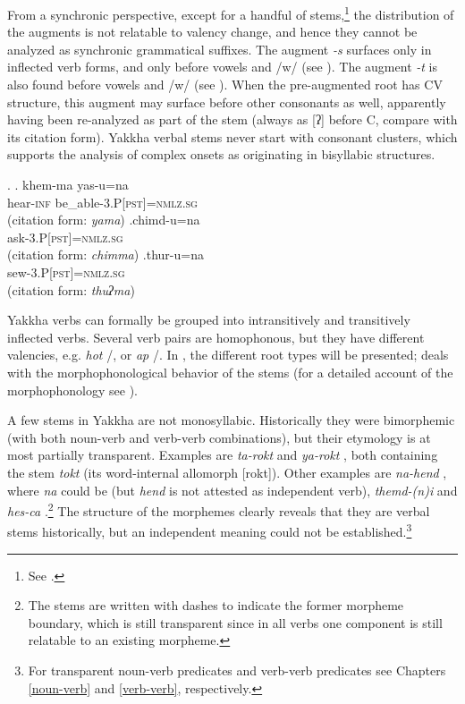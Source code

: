 From a synchronic perspective, except for a handful of stems,\footnote{See .} the distribution of the augments is not relatable to valency change, and hence they cannot be analyzed as synchronic grammatical suffixes. The augment \emph{-s} surfaces only in inflected verb forms, and only before vowels and /w/ (see \Next[a]). The augment \emph{-t} is also found before vowels and /w/ (see \Next[b]). When the pre-augmented root has CV structure, this augment may surface before other consonants as well, apparently having been re-analyzed as part of the  stem (always as [ʔ] before C, compare \Next[c] with its citation form). Yakkha verbal stems never start with consonant clusters, which supports the analysis of complex onsets as originating in bisyllabic structures. 

\ex. \ag. khem-ma yas-u=na\\
 hear{\scshape -inf} be\_able{\scshape -3.P[pst]=nmlz.sg}\\
 (citation form: \emph{yama})
\bg.chimd-u=na\\
ask{\scshape -3.P[pst]=nmlz.sg}\\
 (citation form: \emph{chimma})
\bg.thur-u=na\\
sew{\scshape -3.P[pst]=nmlz.sg}\\
 (citation form: \emph{thuʔma})


Yakkha verbs can  formally  be grouped into intransitively and transitively inflected verbs. Several verb pairs are homophonous, but they have different valencies, e.g. \emph{hot} /, or \emph{ap}   /. In , the different root types will be presented;  deals with the morphophonological behavior of the stems (for a detailed account of the morphophonology see ).

A few stems in Yakkha are not monosyllabic. Historically they were bimorphemic (with both noun-verb and verb-verb combinations), but their etymology is at most partially transparent. Examples are \emph{ta-rokt}  and \emph{ya-rokt} , both containing the stem \emph{tokt}  (its word-internal allomorph [rokt]). Other examples are  \emph{na-hend} , where \emph{na} could be  (but \emph{hend} is not attested as independent verb), \emph{themd-(n)i}  and \emph{hes-ca} .\footnote{The stems are written with dashes to indicate the former morpheme boundary, which is still transparent since in all verbs one component is still relatable to an existing  morpheme.} The structure of the morphemes clearly reveals that they are verbal stems historically, but an independent  meaning could not be established.\footnote{For transparent noun-verb predicates and verb-verb predicates see Chapters \ref{noun-verb} and \ref{verb-verb}, respectively.}

